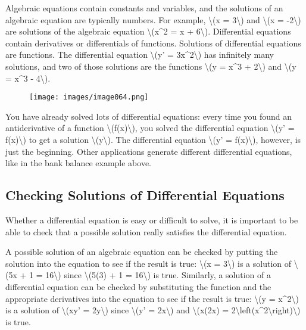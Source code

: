 Algebraic equations contain constants and variables, and the solutions
of an algebraic equation are typically numbers. For example,
\textbackslash{}(x = 3\textbackslash{}) and \textbackslash{}(x =
-2\textbackslash{}) are solutions of the algebraic equation
\textbackslash{}(x\^{}2 = x + 6\textbackslash{}). Differential equations
contain derivatives or differentials of functions. Solutions of
differential equations are functions. The differential equation
\textbackslash{}(y' = 3x\^{}2\textbackslash{}) has infinitely many
solutions, and two of those solutions are the functions
\textbackslash{}(y = x\^{}3 + 2\textbackslash{}) and \textbackslash{}(y
= x\^{}3 - 4\textbackslash{}).

\begin{figure}
\centering
\texttt{[image: images/image064.png]}
\caption{}
\end{figure}

You have already solved lots of differential equations: every time you
found an antiderivative of a function
\textbackslash{}(f(x)\textbackslash{}), you solved the differential
equation \textbackslash{}(y' = f(x)\textbackslash{}) to get a solution
\textbackslash{}(y\textbackslash{}). The differential equation
\textbackslash{}(y' = f(x)\textbackslash{}), however, is just the
beginning. Other applications generate different differential equations,
like in the bank balance example above.

\hypertarget{checking-solutions-of-differential-equations}{%
\subsection{Checking Solutions of Differential
Equations}\label{checking-solutions-of-differential-equations}}

Whether a differential equation is easy or difficult to solve, it is
important to be able to check that a possible solution really satisfies
the differential equation.

A possible solution of an algebraic equation can be checked by putting
the solution into the equation to see if the result is true:
\textbackslash{}(x = 3\textbackslash{}) is a solution of
\textbackslash{}(5x + 1 = 16\textbackslash{}) since
\textbackslash{}(5(3) + 1 = 16\textbackslash{}) is true. Similarly, a
solution of a differential equation can be checked by substituting the
function and the appropriate derivatives into the equation to see if the
result is true: \textbackslash{}(y = x\^{}2\textbackslash{}) is a
solution of \textbackslash{}(xy' = 2y\textbackslash{}) since
\textbackslash{}(y' = 2x\textbackslash{}) and \textbackslash{}(x(2x) =
2\textbackslash{}left(x\^{}2\textbackslash{}right)\textbackslash{}) is
true.

